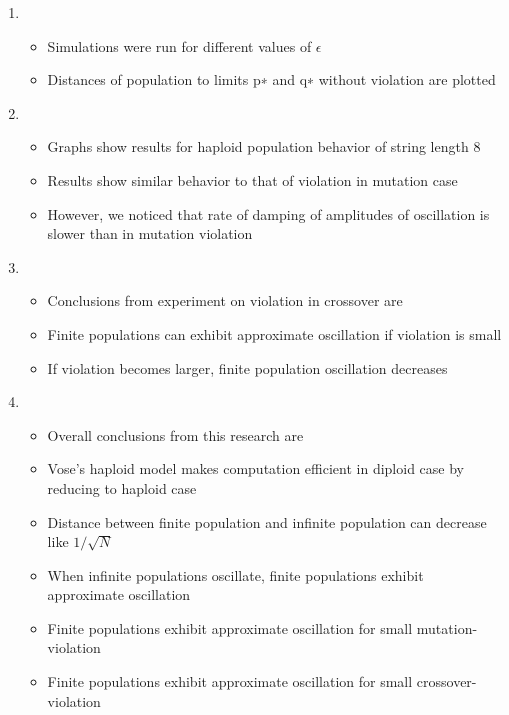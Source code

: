\documentclass{article}
\begin{document}
\begin{enumerate}
\item
  \begin{itemize}
  \item Simulations were run for different values of $\epsilon$
  \item Distances of population to limits p∗ and q∗ without violation are plotted  
  \end{itemize}
  
\item
  \begin{itemize}
  \item Graphs show results for haploid population behavior of string length 8
  \item Results show similar behavior to that of violation in mutation case
  \item However, we noticed that rate of damping of amplitudes of oscillation is slower than in mutation violation 
  
  \end{itemize}  

  
\item
  \begin{itemize}
  \item Conclusions from experiment on violation in crossover are 
  \item Finite populations can exhibit approximate oscillation if violation is small
  \item If violation becomes larger, finite population oscillation decreases
  \end{itemize}
  
\item
  \begin{itemize}
  \item Overall conclusions from this research are
  \item Vose's haploid model makes computation efficient in diploid case by reducing to haploid case 
  \item Distance between finite population and infinite population can decrease like $1/\sqrt{N}$
  \item When infinite populations oscillate, finite populations exhibit approximate oscillation
  \item Finite populations exhibit approximate oscillation for small mutation-violation
  \item Finite populations exhibit approximate oscillation for small crossover-violation      
  
  \end{itemize}
  

\end{enumerate}
\end{document}
